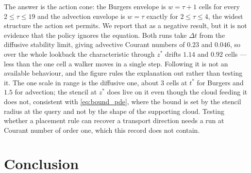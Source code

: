 The answer is the action cone: the Burgers envelope is $w=\tau+1$ cells for every
$2\le\tau\le19$ and the advection envelope is $w=\tau$ exactly for
$2\le\tau\le4$, the widest structure the action set permits. We report that as a
negative result, but it is not evidence that the policy ignores the equation. Both
runs take $\Delta t$ from the diffusive stability limit, giving advective Courant
numbers of $0.23$ and $0.046$, so over the whole lookback the characteristic
through $z^{*}$ drifts $1.14$ and $0.92$ cells --- less than the one cell a
walker moves in a single step. Following it is not an available behaviour, and
the figure rules the explanation out rather than testing it. The one scale in
range is the diffusive one, about $3$ cells at $t^{*}$ for Burgers and $1.5$ for
advection; the stencil at $z^{*}$ does live on it even though the cloud feeding
it does not, consistent with \eqref{eq:bound_pde}, where the bound is set by the
stencil radius at the query and not by the shape of the supporting cloud. Testing
whether a placement rule can recover a transport direction needs a run at Courant
number of order one, which this record does not contain.




\section{Conclusion}
\label{sec:conclusion}

